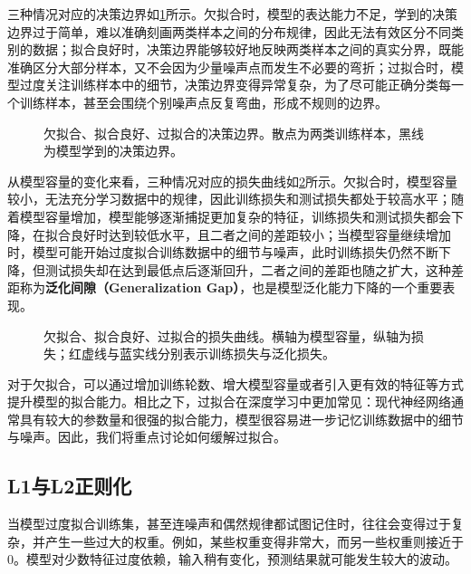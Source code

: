 三种情况对应的决策边界如\cref{fig:underfit_overfit_plot}所示。欠拟合时，模型的表达能力不足，学到的决策边界过于简单，难以准确刻画两类样本之间的分布规律，因此无法有效区分不同类别的数据；拟合良好时，决策边界能够较好地反映两类样本之间的真实分界，既能准确区分大部分样本，又不会因为少量噪声点而发生不必要的弯折；过拟合时，模型过度关注训练样本中的细节，决策边界变得异常复杂，为了尽可能正确分类每一个训练样本，甚至会围绕个别噪声点反复弯曲，形成不规则的边界。

\begin{figure}[H]
    \caption{欠拟合、拟合良好、过拟合的决策边界。散点为两类训练样本，黑线为模型学到的决策边界。}
    \label{fig:underfit_overfit_plot}
\end{figure}

从模型容量的变化来看，三种情况对应的损失曲线如\cref{fig:underfit_overfit_loss}所示。欠拟合时，模型容量较小，无法充分学习数据中的规律，因此训练损失和测试损失都处于较高水平；随着模型容量增加，模型能够逐渐捕捉更加复杂的特征，训练损失和测试损失都会下降，在拟合良好时达到较低水平，且二者之间的差距较小；当模型容量继续增加时，模型可能开始过度拟合训练数据中的细节与噪声，此时训练损失仍然不断下降，但测试损失却在达到最低点后逐渐回升，二者之间的差距也随之扩大，这种差距称为\textbf{泛化间隙（Generalization Gap）}，也是模型泛化能力下降的一个重要表现。

\begin{figure}[H]
    \caption{欠拟合、拟合良好、过拟合的损失曲线。横轴为模型容量，纵轴为损失；红虚线与蓝实线分别表示训练损失与泛化损失。}
    \label{fig:underfit_overfit_loss}
\end{figure}

对于欠拟合，可以通过增加训练轮数、增大模型容量或者引入更有效的特征等方式提升模型的拟合能力。相比之下，过拟合在深度学习中更加常见：现代神经网络通常具有较大的参数量和很强的拟合能力，模型很容易进一步记忆训练数据中的细节与噪声。因此，我们将重点讨论如何缓解过拟合。

\subsection{L1与L2正则化}

当模型过度拟合训练集，甚至连噪声和偶然规律都试图记住时，往往会变得过于复杂，并产生一些过大的权重。例如，某些权重变得非常大，而另一些权重则接近于$0$。模型对少数特征过度依赖，输入稍有变化，预测结果就可能发生较大的波动。

